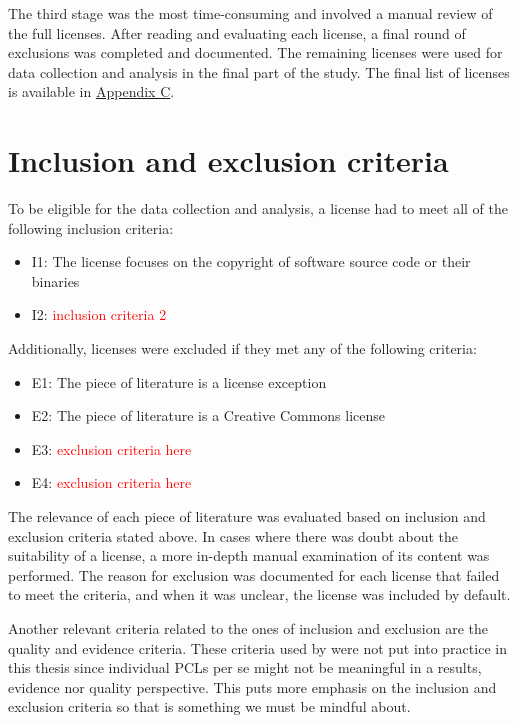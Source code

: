 The third stage was the most time-consuming and involved a manual review of the full licenses. After reading and evaluating each license, a final round of exclusions was completed and documented. The remaining licenses were used for data collection and analysis in the final part of the study. The final list of licenses is available in \hyperref[appendix:c]{Appendix C}.

\section{Inclusion and exclusion criteria}
To be eligible for the data collection and analysis, a license had to meet all of the following inclusion criteria:

\begin{itemize}
	\item I1: The license focuses on the copyright of software source code or their binaries
	\item I2: \textcolor{red}{inclusion criteria 2}
\end{itemize}

Additionally, licenses were excluded if they met any of the following criteria:

\begin{itemize}
	\item E1: The piece of literature is a license exception
	\item E2: The piece of literature is a Creative Commons license
	\item E3: \textcolor{red}{exclusion criteria here}
	\item E4: \textcolor{red}{exclusion criteria here}
\end{itemize}

The relevance of each piece of literature was evaluated based on inclusion and exclusion criteria stated above. In cases where there was doubt about the suitability of a license, a more in-depth manual examination of its content was performed. The reason for exclusion was documented for each license that failed to meet the criteria, and when it was unclear, the license was included by default.

Another relevant criteria related to the ones of inclusion and exclusion are the quality and evidence criteria. These criteria used by \cite{dyba2007} were not put into practice in this thesis since individual PCLs per se might not be meaningful in a results, evidence nor quality perspective. This puts more emphasis on the inclusion and exclusion criteria so that is something we must be mindful about.

